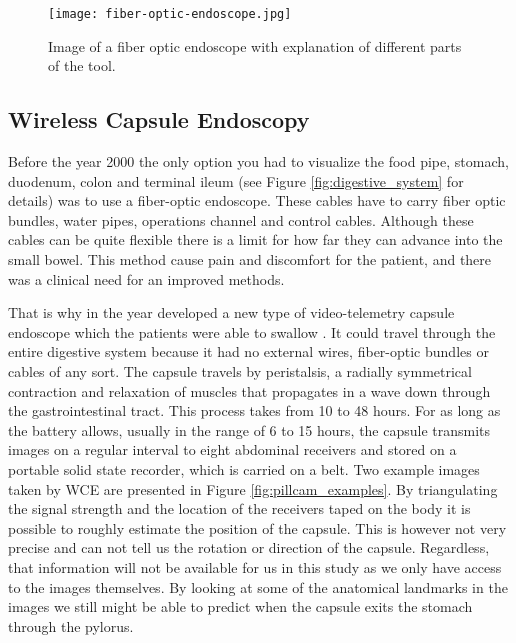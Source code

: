 \documentclass[thesis.tex]{subfiles}
\begin{document}
\begin{figure}[h] %
  \begin{center}
    \texttt{[image: fiber-optic-endoscope.jpg]}
    \caption[Image of a fiber optic endoscope with explanation of different parts of the tool]{Image of a fiber optic endoscope with explanation of different parts of the tool\footnotemark.}
    \label{fig:fiber-optic-endoscopy}
  \end{center}
\end{figure}




\subsection{Wireless Capsule Endoscopy}  \label{sec:wireless_capsule_endoscopy}
Before the year 2000 the only option you had to visualize the food pipe, stomach, duodenum, colon and terminal ileum (see Figure \ref{fig:digestive_system} for details) was to use a fiber-optic endoscope. These cables have to carry fiber optic bundles, water pipes, operations channel and control cables. Although these cables can be quite flexible there is a limit for how far they can advance into the small bowel. This method cause pain and discomfort for the patient, and there was a clinical need for an improved methods.

That is why in the year \citeyear{WirelessCapsule00} \citeauthor*{WirelessCapsule00} developed a new type of video-telemetry capsule endoscope which the patients were able to swallow \cite{WirelessCapsule00}. It could travel through the entire digestive system because it had no external wires, fiber-optic bundles or cables of any sort. The capsule travels by peristalsis, a radially symmetrical contraction and relaxation of muscles that propagates in a wave down through the gastrointestinal tract. This process takes from 10 to 48 hours. For as long as the battery allows, usually in the range of 6 to 15 hours, the capsule transmits images on a regular interval to eight abdominal receivers and stored on a portable solid state recorder, which is carried on a belt. %
Two example images taken by WCE are presented in Figure \ref{fig:pillcam_examples}. By triangulating the signal strength and the location of the receivers taped on the body it is possible to roughly estimate the position of the capsule. This is however not very precise and can not tell us the rotation or direction of the capsule. Regardless, that information will not be available for us in this study as we only have access to the images themselves. By looking at some of the anatomical landmarks in the images we still might be able to predict when the capsule exits the stomach through the pylorus. %
\end{document}

